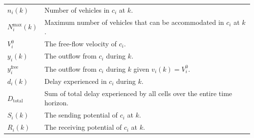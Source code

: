 \documentclass[conference]{IEEEtran}
\begin{document}
\begin{table}[!h]
{\begin{tabular}{p{1.5cm}p{6cm}}
			$n_i(k)$                         & Number of vehicles in $c_i$ at $k$.                                                                                                                                                                         \\
			$N_i^{\text{max}}(k)$            & Maximum number of vehicles that can be accommodated in $c_i$ at $k$.                                                              \\                                                                                                                                                                                         
			$V^0_i$                          & The free-flow velocity of $c_i$.                                                                                                                                                                                    \\
			$y_i(k)$                         & The outflow  from $c_i$ during $k$.                                                           \\
			$y_i^{\text{free}}$              & The outflow from $c_i$ during $k$ given $v_i(k)=V^0_i$.                                                                                                                                                               \\
			$d_i(k)$                         & Delay experienced in $c_i$ during $k$.                                                                                                                                                                                     \\
			$D_{\text{total}}$               & Sum of total delay experienced by all cells over the entire time horizon.                                                                                                                                                  \\
			$S_i(k)$                         & The sending potential of $c_i$ at $k$.                                                                                                                                                                    \\
			$R_i(k)$                         & The receiving potential of $c_i$ at  $k$.                                                                                                                                                                                                                                                                                                                                       \\

\end{tabular}}
\end{table}
\end{document}
